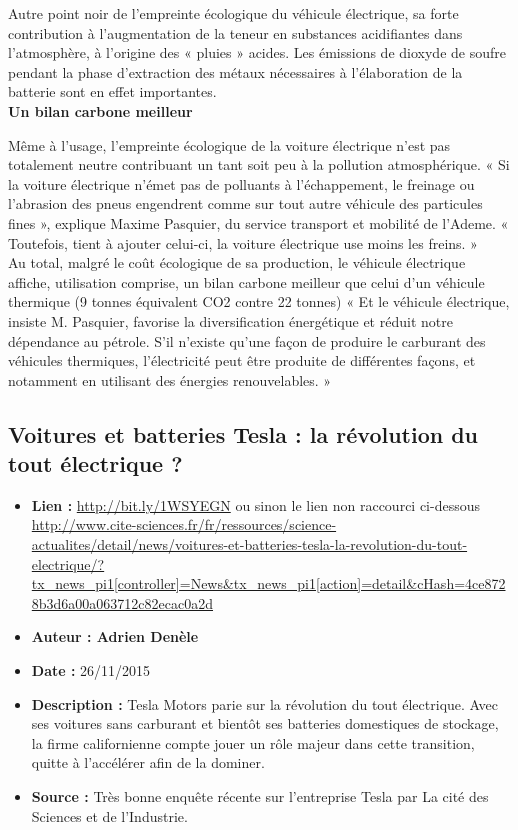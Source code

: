 \documentclass[8pt]{article}
\begin{document}
Autre point noir de l’empreinte écologique du véhicule électrique, sa forte contribution à l’augmentation de la teneur en substances acidifiantes dans l’atmosphère, à l’origine des « pluies » acides. Les émissions de dioxyde de soufre pendant la phase d’extraction des métaux nécessaires à l’élaboration de la batterie sont en effet importantes.  \\

\textbf{Un bilan carbone meilleur}

Même à l’usage, l’empreinte écologique de la voiture électrique n’est pas totalement neutre contribuant un tant soit peu à la pollution atmosphérique. « Si la voiture électrique n’émet pas de polluants à l’échappement, le freinage ou l’abrasion des pneus engendrent comme sur tout autre véhicule des particules fines », explique Maxime Pasquier, du service transport et mobilité de l’Ademe. « Toutefois, tient à ajouter celui-ci, la voiture électrique use moins les freins. »  \\

Au total, malgré le coût écologique de sa production, le véhicule électrique affiche, utilisation comprise, un bilan carbone meilleur que celui d’un véhicule thermique (9 tonnes équivalent CO2 contre 22 tonnes) « Et le véhicule électrique, insiste M. Pasquier, favorise la diversification énergétique et réduit notre dépendance au pétrole. S’il n’existe qu’une façon de produire le carburant des véhicules thermiques, l’électricité peut être produite de différentes façons, et notamment en utilisant des énergies renouvelables. » \\

\newpage
\subsection{Voitures et batteries Tesla : la révolution du tout électrique ?}
 
\begin{itemize}
	\item \textbf{Lien : }  \url{http://bit.ly/1WSYEGN}  ou sinon le lien non raccourci ci-dessous \\  \url{http://www.cite-sciences.fr/fr/ressources/science-actualites/detail/news/voitures-et-batteries-tesla-la-revolution-du-tout-electrique/?tx_news_pi1[controller]=News&tx_news_pi1[action]=detail&cHash=4ce8728b3d6a00a063712c82ecac0a2d
}
	\item \textbf{Auteur : Adrien Denèle}
	\item \textbf{Date : } 26/11/2015
	\item \textbf{Description : }  Tesla Motors parie sur la révolution du tout électrique. Avec ses voitures sans carburant et bientôt ses batteries domestiques de stockage, la firme californienne compte jouer un rôle majeur dans cette transition, quitte à l’accélérer afin de la dominer.
	\item \textbf{Source : } Très bonne enquête récente sur l'entreprise Tesla par La cité des Sciences et de l'Industrie. 
\end{itemize}
\end{document}
